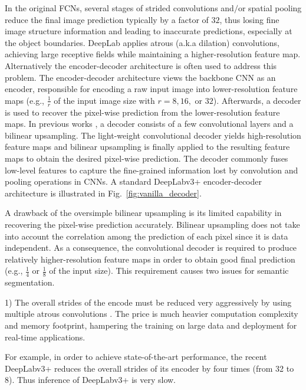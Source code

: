 \documentclass[10pt,twocolumn,letterpaper]{article}
\newcommand{\1}{{\mathbbm{1}}}
\begin{document}
In the original FCNs, several stages of strided convolutions and$/$or spatial
pooling reduce the final image
prediction typically by a factor of $32$, thus losing fine image structure information and leading to inaccurate predictions, especially at the object boundaries.
DeepLab \cite{chen2018deeplab} applies atrous (a.k.a dilation) convolutions, achieving large receptive fields while maintaining a higher-resolution feature map.
Alternatively the encoder-decoder architecture is often used to  address this  problem. The encoder-decoder architecture views the backbone CNN as an encoder, responsible for encoding a raw input image into lower-resolution feature maps (e.g., $\frac{1}{r}$ of the input image size with  $r=8,16,$ or $32$). Afterwards, a decoder is used to recover the pixel-wise prediction from the lower-resolution feature maps. In previous works \cite{chen2018encoder, lin2017refinenet}, a decoder consists of a few convolutional layers
and a bilinear upsampling. The light-weight convolutional decoder yields high-resolution feature maps and  bilinear upsampling  is finally applied to the resulting feature maps to obtain the desired pixel-wise prediction. The decoder commonly fuses low-level features to capture the fine-grained information lost by convolution and pooling operations in CNNs. A standard DeepLabv3+ encoder-decoder architecture is illustrated in Fig.~\ref{fig:vanilla_decoder}.



A drawback of the oversimple bilinear upsampling  is  its
limited capability
in recovering the pixel-wise prediction accurately.
Bilinear upsampling
does not take into account the correlation among the prediction of each pixel since it is data independent.
As a consequence,  the convolutional decoder is required to produce
relatively higher-resolution feature maps in order to obtain good final prediction (e.g., $ \frac{1}{4} $ or $ \frac{1}{8}$ of the input size).
This requirement causes two
issues for semantic segmentation.

1) The overall strides of the encode  must be reduced
very aggressively by using
 multiple atrous convolutions \cite{chen2018deeplab, yu2015multi}.
The price is much heavier
  computation complexity and memory footprint,
  hampering the training on large data and deployment for real-time applications.



  For example, in order to achieve  state-of-the-art performance, the recent DeepLabv3+ \cite{chen2018encoder} reduces the overall strides of its encoder by four times (from 32 to 8). Thus  inference of DeepLabv3+ is very slow.
\end{document}
